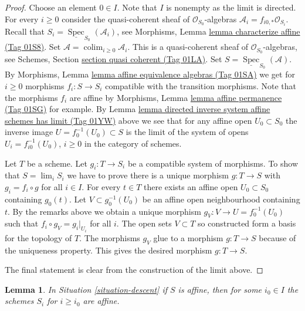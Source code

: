\documentclass{amsart}
\theoremstyle{plain}
\newtheorem{lemma}[subsection]{Lemma}
\theoremstyle{definition}
\theoremstyle{remark}
\numberwithin{equation}{subsection}
\def\lim{\mathop{\mathrm{lim}}\nolimits}
\def\colim{\mathop{\mathrm{colim}}\nolimits}
\def\Spec{\mathop{\mathrm{Spec}}}
\begin{document}
\begin{proof}
Choose an element $0 \in I$. Note that $I$ is nonempty as the limit is
directed. For every $i \geq 0$ consider the quasi-coherent sheaf of
$\mathcal{O}_{S_0}$-algebras $\mathcal{A}_i = f_{i0, *}\mathcal{O}_{S_i}$.
Recall that $S_i = \underline{\Spec}_{S_0}(\mathcal{A}_i)$,
see Morphisms, Lemma \href{https://stacks.math.columbia.edu/tag/01S8}{lemma characterize affine (Tag 01S8)}.
Set $\mathcal{A} = \colim_{i \geq 0} \mathcal{A}_i$.
This is a quasi-coherent sheaf of $\mathcal{O}_{S_0}$-algebras,
see Schemes, Section \href{https://stacks.math.columbia.edu/tag/01LA}{section quasi coherent (Tag 01LA)}.
Set $S = \underline{\Spec}_{S_0}(\mathcal{A})$.
By Morphisms, Lemma \href{https://stacks.math.columbia.edu/tag/01SA}{lemma affine equivalence algebras (Tag 01SA)}
we get for $i \geq 0$ morphisms $f_i : S \to S_i$ compatible with
the transition morphisms. Note that the morphisms $f_i$ are
affine by Morphisms, Lemma \href{https://stacks.math.columbia.edu/tag/01SG}{lemma affine permanence (Tag 01SG)} for example.
By Lemma \href{https://stacks.math.columbia.edu/tag/01YW}{lemma directed inverse system affine schemes has limit (Tag 01YW)} above
we see that for any affine open $U_0 \subset S_0$ the
inverse image $U = f_0^{-1}(U_0) \subset S$ is the limit of the
system of opens $U_i = f_{i0}^{-1}(U_0)$, $i \geq 0$ in the
category of schemes.

\medskip\noindent
Let $T$ be a scheme. Let $g_i : T \to S_i$ be a compatible system
of morphisms. To show that $S = \lim_i S_i$ we have
to prove there is a unique morphism $g : T \to S$ with
$g_i = f_i \circ g$ for all $i \in I$.
For every $t \in T$ there exists an affine open
$U_0 \subset S_0$ containing $g_0(t)$. Let $V \subset g_0^{-1}(U_0)$
be an affine open neighbourhood containing $t$.
By the remarks above we obtain a unique morphism
$g_V : V \to U = f_0^{-1}(U_0)$ such that $f_i \circ g_V = g_i|_{U_i}$
for all $i$. The open sets $V \subset T$ so constructed form
a basis for the topology of $T$. The morphisms $g_V$ glue to a morphism
$g : T \to S$ because of the uniqueness property. This gives the
desired morphism $g : T \to S$.

\medskip\noindent
The final statement is clear from the construction of the limit above.
\end{proof}


\begin{lemma}
\label{lemma-limit-affine}
In Situation \ref{situation-descent} if $S$ is affine,
then for some $i_0 \in I$ the schemes $S_i$ for $i \geq i_0$
are affine.
\end{lemma}
\end{document}
